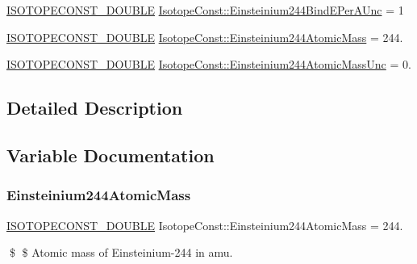 \begin{DoxyCompactItemize}
\mbox{\hyperlink{group___isotope_const-_macros_ga8f45a7272ce02c0b4c65c44636ed719a}{I\+S\+O\+T\+O\+P\+E\+C\+O\+N\+S\+T\+\_\+\+D\+O\+U\+B\+LE}} \mbox{\hyperlink{group___isotope_const-_einsteinium-_es244_gabcdc4fa7417401eaf5668c254e113e65}{Isotope\+Const\+::\+Einsteinium244\+Bind\+E\+Per\+A\+Unc}} = 1
\item 
\mbox{\hyperlink{group___isotope_const-_macros_ga8f45a7272ce02c0b4c65c44636ed719a}{I\+S\+O\+T\+O\+P\+E\+C\+O\+N\+S\+T\+\_\+\+D\+O\+U\+B\+LE}} \mbox{\hyperlink{group___isotope_const-_einsteinium-_es244_ga63e2e0f387ca1041a8725fbb70849dbc}{Isotope\+Const\+::\+Einsteinium244\+Atomic\+Mass}} = 244.
\item 
\mbox{\hyperlink{group___isotope_const-_macros_ga8f45a7272ce02c0b4c65c44636ed719a}{I\+S\+O\+T\+O\+P\+E\+C\+O\+N\+S\+T\+\_\+\+D\+O\+U\+B\+LE}} \mbox{\hyperlink{group___isotope_const-_einsteinium-_es244_gae4c580d44fbeb7b5a3922fa7133024b8}{Isotope\+Const\+::\+Einsteinium244\+Atomic\+Mass\+Unc}} = 0.
\end{DoxyCompactItemize}


\subsection{Detailed Description}


\subsection{Variable Documentation}
\mbox{\label{group___isotope_const-_einsteinium-_es244_ga63e2e0f387ca1041a8725fbb70849dbc}} 
\subsubsection{\texorpdfstring{Einsteinium244\+Atomic\+Mass}{Einsteinium244AtomicMass}}
{\footnotesize\ttfamily \mbox{\hyperlink{group___isotope_const-_macros_ga8f45a7272ce02c0b4c65c44636ed719a}{I\+S\+O\+T\+O\+P\+E\+C\+O\+N\+S\+T\+\_\+\+D\+O\+U\+B\+LE}} Isotope\+Const\+::\+Einsteinium244\+Atomic\+Mass = 244.}

\$ \$ Atomic mass of Einsteinium-\/244 in amu. \mbox{\label{group___isotope_const-_einsteinium-_es244_gae4c580d44fbeb7b5a3922fa7133024b8}} 

